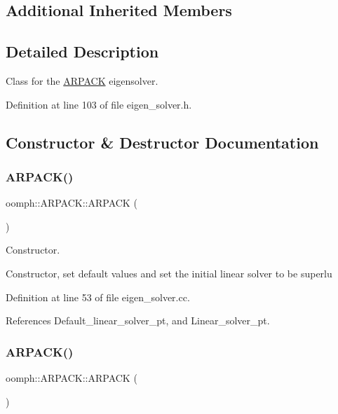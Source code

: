 \subsection*{Additional Inherited Members}


\subsection{Detailed Description}
Class for the \hyperlink{classoomph_1_1ARPACK}{A\+R\+P\+A\+CK} eigensolver. 

Definition at line 103 of file eigen\+\_\+solver.\+h.



\subsection{Constructor \& Destructor Documentation}
\mbox{\label{classoomph_1_1ARPACK_aef258a621d2ba000382d8e0cc9118e8d}} 
\subsubsection{\texorpdfstring{A\+R\+P\+A\+C\+K()}{ARPACK()}\hspace{0.1cm}{\footnotesize\ttfamily [1/2]}}
{\footnotesize\ttfamily oomph\+::\+A\+R\+P\+A\+C\+K\+::\+A\+R\+P\+A\+CK (\begin{DoxyParamCaption}{ }\end{DoxyParamCaption})}



Constructor. 

Constructor, set default values and set the initial linear solver to be superlu 

Definition at line 53 of file eigen\+\_\+solver.\+cc.



References Default\+\_\+linear\+\_\+solver\+\_\+pt, and Linear\+\_\+solver\+\_\+pt.

\mbox{\label{classoomph_1_1ARPACK_a0461252a3602e71c52400b5994cb9efa}} 
\subsubsection{\texorpdfstring{A\+R\+P\+A\+C\+K()}{ARPACK()}\hspace{0.1cm}{\footnotesize\ttfamily [2/2]}}
{\footnotesize\ttfamily oomph\+::\+A\+R\+P\+A\+C\+K\+::\+A\+R\+P\+A\+CK (\begin{DoxyParamCaption}\item[{const \hyperlink{classoomph_1_1ARPACK}{A\+R\+P\+A\+CK} \&}]{ }\end{DoxyParamCaption})\hspace{0.3cm}{\ttfamily [inline]}}



